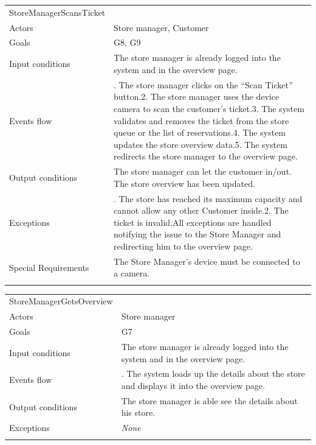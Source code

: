 \documentclass[
]{article}
\begin{document}
\begin{longtable}[]{@{}
  >{\raggedright\arraybackslash}p{}
  >{\raggedright\arraybackslash}p{}@{}}
\toprule
StoreManagerScansTicket & \\ \addlinespace
\midrule
\endhead
Actors & Store manager, Customer \\ \addlinespace
Goals & G8, G9 \\ \addlinespace
Input conditions & The store manager is already logged into the system
and in the overview page. \\ \addlinespace
Events flow & 1. The store manager clicks on the ``Scan Ticket''
button.2. The store manager uses the device camera to scan the
customer's ticket.3. The system validates and removes the ticket from
the store queue or the list of reservations.4. The system updates the
store overview data.5. The system redirects the store manager to the
overview page. \\ \addlinespace
Output conditions & The store manager can let the customer in/out. The
store overview has been updated. \\ \addlinespace
Exceptions & 1. The store has reached its maximum capacity and cannot
allow any other Customer inside.2. The ticket is invalid.All exceptions
are handled notifying the issue to the Store Manager and redirecting him
to the overview page. \\ \addlinespace
Special Requirements & The Store Manager's device must be connected to a
camera. \\ \addlinespace
\bottomrule
\end{longtable}

\begin{longtable}[]{@{}
  >{\raggedright\arraybackslash}p{}
  >{\raggedright\arraybackslash}p{}@{}}
\toprule
StoreManagerGetsOverview & \\ \addlinespace
\midrule
\endhead
Actors & Store manager \\ \addlinespace
Goals & G7 \\ \addlinespace
Input conditions & The store manager is already logged into the system
and in the overview page. \\ \addlinespace
Events flow & 1. The system loads up the details about the store and
displays it into the overview page. \\ \addlinespace
Output conditions & The store manager is able see the details about his
store. \\ \addlinespace
Exceptions & \emph{None} \\ \addlinespace
\bottomrule
\end{longtable}
\end{document}
